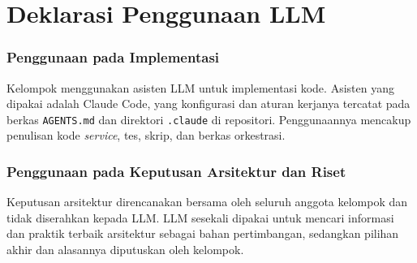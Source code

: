 \chapter*{Deklarasi Penggunaan LLM}

\subsection*{Penggunaan pada Implementasi}

Kelompok menggunakan asisten LLM untuk implementasi kode. Asisten yang dipakai adalah Claude Code, yang konfigurasi dan aturan kerjanya tercatat pada berkas \texttt{AGENTS.md} dan direktori \texttt{.claude} di repositori. Penggunaannya mencakup penulisan kode \textit{service}, tes, skrip, dan berkas orkestrasi.

\subsection*{Penggunaan pada Keputusan Arsitektur dan Riset}

Keputusan arsitektur direncanakan bersama oleh seluruh anggota kelompok dan tidak diserahkan kepada LLM. LLM sesekali dipakai untuk mencari informasi dan praktik terbaik arsitektur sebagai bahan pertimbangan, sedangkan pilihan akhir dan alasannya diputuskan oleh kelompok.
